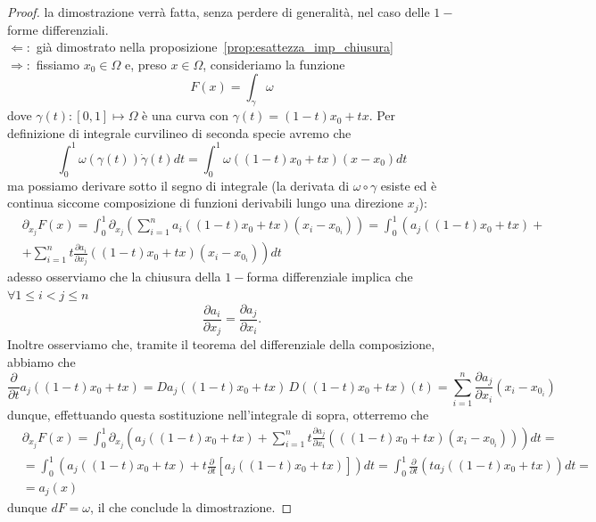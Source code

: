 \begin{proof} 
	la dimostrazione verrà fatta, senza perdere di generalità, nel caso delle $1-$forme differenziali. \\
	$\boxed{\Leftarrow}:$ già dimostrato nella proposizione~\ref{prop:esattezza_imp_chiusura} \\
	$\boxed{\Rightarrow}:$ %
	fissiamo $x_0 \in \Omega$ e, preso $x \in \Omega$, consideriamo la funzione
	$$
		F(x) = \int_\gamma \omega
	$$
	dove $\gamma(t) : [0, 1] \mapsto \Omega$ è una curva con $\gamma(t)=(1-t) x_0 + tx$. Per definizione di integrale curvilineo di seconda specie avremo che
	$$
		\int_0^1 \omega(\gamma(t)) \dot{\gamma}(t) dt = \int_0^1 \omega((1-t)x_0 + tx)(x-x_0)dt
	$$
	ma possiamo derivare sotto il segno di integrale (la derivata di $\omega \circ \gamma$ esiste ed è continua siccome composizione di funzioni derivabili lungo una direzione $x_j$):
	\begin{align*}
	&\partial_{x_j} F(x) = \int_0^1 \partial_{x_j} \left(\sum_{i=1}^n a_i((1-t)x_0 + tx)(x_i-x_{0_i}) \right) = \int_0^1 \left(a_j((1-t)x_0 + tx) + \right. \\
	&+ \left. \sum_{i=1}^n t\frac{\partial a_i}{\partial x_j}((1-t)x_0 + tx)(x_i - x_{0_i}) \right) dt
	\end{align*}
	adesso osserviamo che la chiusura della $1-$forma differenziale implica che $\forall 1 \leq i < j \leq n$
	$$
	\frac{\partial a_i}{\partial x_j} = \frac{\partial a_j}{\partial x_i}.
	$$
	Inoltre osserviamo che, tramite il teorema del differenziale della composizione, abbiamo che 
	$$
		\frac{\partial}{\partial t} a_j((1-t)x_0 + tx) = Da_j((1-t)x_0 + tx) \, D((1-t)x_0 + tx)(t) = \sum_{i=1}^n \frac{\partial a_j}{\partial x_i}(x_i - x_{0_i})
	$$
	dunque, effettuando questa sostituzione nell'integrale di sopra, otterremo che
	\begin{align*}
	&\partial_{x_j} F(x) = \int_0^1 \partial_{x_j} \left(a_j((1-t)x_0 + tx) + \sum_{i=1}^n t\frac{\partial a_j}{\partial x_i} \left( ((1-t)x_0 + tx) (x_i - x_{0_i}) \right) \right) dt = \\
	&=\int_0^1 \left( a_j((1-t)x_0 + tx) + t\frac{\partial}{\partial t} \left[ a_j((1-t)x_0 + tx) \right] \right)dt = \int_0^1 \frac{\partial}{\partial t} \left( ta_j((1-t)x_0 + tx) \right)dt = \\
	&=a_j(x) 
	\end{align*}
	dunque $dF=\omega$, il che conclude la dimostrazione.
\end{proof}
